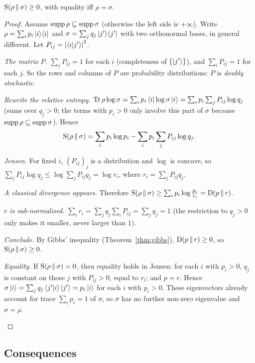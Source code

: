 \begin{theorem}\label{thm:klein}
  $\mathrm{S}\!\left(\rho\,\middle\|\,\sigma\right)\ge0$, with equality iff $\rho=\sigma$.
\end{theorem}
\begin{proof}
  Assume $\operatorname{supp}\rho\subseteq\operatorname{supp}\sigma$ (otherwise the left side is $+\infty$). Write $\rho=\sum_ip_i\left|i\right\rangle\!\left\langle i\right|$ and $\sigma=\sum_jq_j\left|j'\right\rangle\!\left\langle j'\right|$ with two orthonormal bases, in general different. Let $P_{ij}=\left|\left\langle i\middle|j'\right\rangle\right|^2$.
  \begin{steps}
    \item \emph{The matrix $P$.} $\sum_jP_{ij}=1$ for each $i$ (completeness of $\{\left|j'\right\rangle\}$), and $\sum_iP_{ij}=1$ for each $j$. So the rows and columns of $P$ are probability distributions: $P$ is \emph{doubly stochastic}.
    \item \emph{Rewrite the relative entropy.} $\operatorname{Tr}\rho\log\sigma=\sum_ip_i\left\langle i\right|\log\sigma\left|i\right\rangle=\sum_ip_i\sum_jP_{ij}\log q_j$ (sums over $q_j>0$; the terms with $p_i>0$ only involve this part of $\sigma$ because $\operatorname{supp}\rho\subseteq\operatorname{supp}\sigma$). Hence
      \[
        \mathrm{S}\!\left(\rho\,\middle\|\,\sigma\right)=\sum_ip_i\log p_i-\sum_ip_i\sum_jP_{ij}\log q_j .
      \]
    \item \emph{Jensen.} For fixed $i$, $(P_{ij})_j$ is a distribution and $\log$ is concave, so $\sum_jP_{ij}\log q_j\le\log\sum_jP_{ij}q_j=\log r_i$, where $r_i=\sum_jP_{ij}q_j$.
    \item \emph{A classical divergence appears.} Therefore $\mathrm{S}\!\left(\rho\,\middle\|\,\sigma\right)\ge\sum_ip_i\log\frac{p_i}{r_i}=\mathrm{D}\!\left(p\,\middle\|\,r\right)$.
    \item \emph{$r$ is sub-normalised.} $\sum_ir_i=\sum_jq_j\sum_iP_{ij}=\sum_jq_j=1$ (the restriction to $q_j>0$ only makes it smaller, never larger than $1$).
    \item \emph{Conclude.} By Gibbs' inequality (Theorem~\ref{thm:gibbs}), $\mathrm{D}\!\left(p\,\middle\|\,r\right)\ge0$, so $\mathrm{S}\!\left(\rho\,\middle\|\,\sigma\right)\ge0$.
    \item \emph{Equality.} If $\mathrm{S}\!\left(\rho\,\middle\|\,\sigma\right)=0$, then equality holds in Jensen: for each $i$ with $p_i>0$, $q_j$ is constant on those $j$ with $P_{ij}>0$, equal to $r_i$; and $p=r$. Hence $\sigma\left|i\right\rangle=\sum_jq_j\left\langle j'\middle|i\right\rangle\left|j'\right\rangle=p_i\left|i\right\rangle$ for each $i$ with $p_i>0$. These eigenvectors already account for trace $\sum_ip_i=1$ of $\sigma$, so $\sigma$ has no further non-zero eigenvalue and $\sigma=\rho$. \qedhere
  \end{steps}
\end{proof}

\subsection{Consequences}

